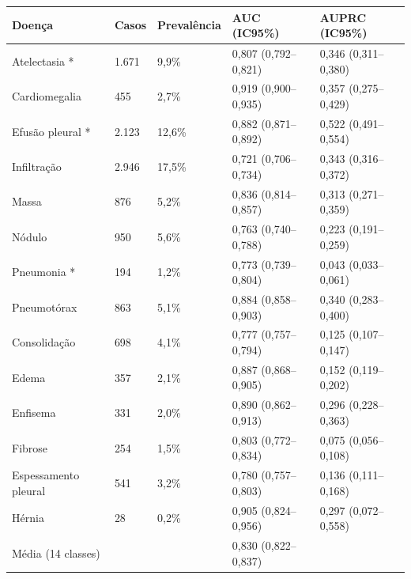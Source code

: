 \begin{tabular}{lllll}
\toprule
Doença & Casos & Prevalência & AUC (IC95\%) & AUPRC (IC95\%) \\
\midrule
Atelectasia * & 1.671 & 9,9\% & 0,807 (0,792–0,821) & 0,346 (0,311–0,380) \\
Cardiomegalia & 455 & 2,7\% & 0,919 (0,900–0,935) & 0,357 (0,275–0,429) \\
Efusão pleural * & 2.123 & 12,6\% & 0,882 (0,871–0,892) & 0,522 (0,491–0,554) \\
Infiltração & 2.946 & 17,5\% & 0,721 (0,706–0,734) & 0,343 (0,316–0,372) \\
Massa & 876 & 5,2\% & 0,836 (0,814–0,857) & 0,313 (0,271–0,359) \\
Nódulo & 950 & 5,6\% & 0,763 (0,740–0,788) & 0,223 (0,191–0,259) \\
Pneumonia * & 194 & 1,2\% & 0,773 (0,739–0,804) & 0,043 (0,033–0,061) \\
Pneumotórax & 863 & 5,1\% & 0,884 (0,858–0,903) & 0,340 (0,283–0,400) \\
Consolidação & 698 & 4,1\% & 0,777 (0,757–0,794) & 0,125 (0,107–0,147) \\
Edema & 357 & 2,1\% & 0,887 (0,868–0,905) & 0,152 (0,119–0,202) \\
Enfisema & 331 & 2,0\% & 0,890 (0,862–0,913) & 0,296 (0,228–0,363) \\
Fibrose & 254 & 1,5\% & 0,803 (0,772–0,834) & 0,075 (0,056–0,108) \\
Espessamento pleural & 541 & 3,2\% & 0,780 (0,757–0,803) & 0,136 (0,111–0,168) \\
Hérnia & 28 & 0,2\% & 0,905 (0,824–0,956) & 0,297 (0,072–0,558) \\
Média (14 classes) &  &  & 0,830 (0,822–0,837) &  \\
\bottomrule
\end{tabular}
